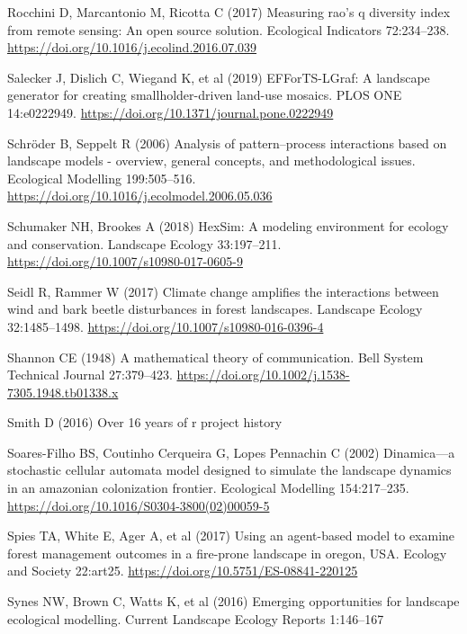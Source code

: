 \documentclass[
  10pt,
  a4paperpaper,
]{article}
\newlength{\cslhangindent}
\newenvironment{CSLReferences}[2] %
 {\begin{list}{}{%
  \setlength{\itemindent}{0pt}
  \setlength{\leftmargin}{0pt}
  \setlength{\parsep}{0pt}
  \ifodd #1
   \setlength{\leftmargin}{\cslhangindent}
   \setlength{\itemindent}{-1\cslhangindent}
  \fi
  \setlength{\itemsep}{#2\baselineskip}}}
 {\end{list}}
\begin{document}
\begin{CSLReferences}{1}{1}
Rocchini D, Marcantonio M, Ricotta C (2017) Measuring rao's q diversity
index from remote sensing: An open source solution. Ecological
Indicators 72:234--238.
\url{https://doi.org/10.1016/j.ecolind.2016.07.039}

Salecker J, Dislich C, Wiegand K, et al (2019) EFForTS-LGraf: A
landscape generator for creating smallholder-driven land-use mosaics.
PLOS ONE 14:e0222949. \url{https://doi.org/10.1371/journal.pone.0222949}

Schröder B, Seppelt R (2006) Analysis of pattern--process interactions
based on landscape models - overview, general concepts, and
methodological issues. Ecological Modelling 199:505--516.
\url{https://doi.org/10.1016/j.ecolmodel.2006.05.036}

Schumaker NH, Brookes A (2018) HexSim: A modeling environment for
ecology and conservation. Landscape Ecology 33:197--211.
\url{https://doi.org/10.1007/s10980-017-0605-9}

Seidl R, Rammer W (2017) Climate change amplifies the interactions
between wind and bark beetle disturbances in forest landscapes.
Landscape Ecology 32:1485--1498.
\url{https://doi.org/10.1007/s10980-016-0396-4}

Shannon CE (1948) A mathematical theory of communication. Bell System
Technical Journal 27:379--423.
\url{https://doi.org/10.1002/j.1538-7305.1948.tb01338.x}

Smith D (2016) Over 16 years of r project history

Soares-Filho BS, Coutinho Cerqueira G, Lopes Pennachin C (2002)
Dinamica---a stochastic cellular automata model designed to simulate the
landscape dynamics in an amazonian colonization frontier. Ecological
Modelling 154:217--235.
\url{https://doi.org/10.1016/S0304-3800(02)00059-5}

Spies TA, White E, Ager A, et al (2017) Using an agent-based model to
examine forest management outcomes in a fire-prone landscape in oregon,
USA. Ecology and Society 22:art25.
\url{https://doi.org/10.5751/ES-08841-220125}

Synes NW, Brown C, Watts K, et al (2016) Emerging opportunities for
landscape ecological modelling. Current Landscape Ecology Reports
1:146--167


\end{CSLReferences}
\end{document}
